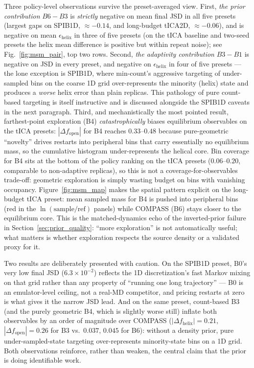 \documentclass[journal=jctcce,manuscript=article,layout=twocolumn]{achemso}
\begin{document}
Three policy-level observations survive the preset-averaged view. First, \emph{the prior contribution} $B6{-}B3$ is \emph{strictly} negative on mean final JSD in all five presets (largest gaps on SPIB1D, $\approx -0.14$, and long-budget tICA2D, $\approx -0.06$), and is negative on mean $\epsilon_{\mathrm{helix}}$ in three of five presets (on the tICA baseline and two-seed presets the helix mean difference is positive but within repeat noise); see Fig.~\ref{fig:msm_pair}, top two rows. Second, \emph{the adaptivity contribution} $B3{-}B1$ is negative on JSD in every preset, and negative on $\epsilon_{\mathrm{helix}}$ in four of five presets --- the lone exception is SPIB1D, where min-count's aggressive targeting of under-sampled bins on the coarse 1D grid over-represents the minority (helix) state and produces a \emph{worse} helix error than plain replicas. This pathology of pure count-based targeting is itself instructive and is discussed alongside the SPIB1D caveats in the next paragraph. Third, and mechanistically the most pointed result, farthest-point exploration (B4) \emph{catastrophically} biases equilibrium observables on the tICA presets: $|\Delta f_{\mathrm{open}}|$ for B4 reaches $0.33$--$0.48$ because pure-geometric ``novelty'' drives restarts into peripheral bins that carry essentially no equilibrium mass, so the cumulative histogram under-represents the helical core. Bin coverage for B4 sits at the bottom of the policy ranking on the tICA presets ($0.06$--$0.20$, comparable to non-adaptive replicas), so this is not a coverage-for-observables trade-off: geometric exploration is simply wasting budget on bins with vanishing occupancy. Figure~\ref{fig:msm_map} makes the spatial pattern explicit on the long-budget tICA preset: mean sampled mass for B4 is pushed into peripheral bins (red in the $\ln(\mathrm{sample}/\mathrm{ref})$ panels) while COMPASS (B6) stays closer to the equilibrium core. This is the matched-dynamics echo of the inverted-prior failure in Section~\ref{sec:prior_quality}: ``more exploration'' is not automatically useful; what matters is whether exploration respects the source density or a validated proxy for it.

Two results are deliberately presented with caution. On the SPIB1D preset, B0's very low final JSD ($6.3\times10^{-2}$) reflects the 1D discretization's fast Markov mixing on that grid rather than any property of ``running one long trajectory'' --- B0 is an emulator-level ceiling, not a real-MD competitor, and pricing restarts at zero is what gives it the narrow JSD lead. And on the same preset, count-based B3 (and the purely geometric B4, which is slightly worse still) inflate both observables by an order of magnitude over COMPASS ($|\Delta f_{\mathrm{helix}}|=0.21$, $|\Delta f_{\mathrm{open}}|=0.26$ for B3 vs.\ $0.037$, $0.045$ for B6): without a density prior, pure under-sampled-state targeting over-represents minority-state bins on a 1D grid. Both observations reinforce, rather than weaken, the central claim that the prior is doing identifiable work.
\end{document}
